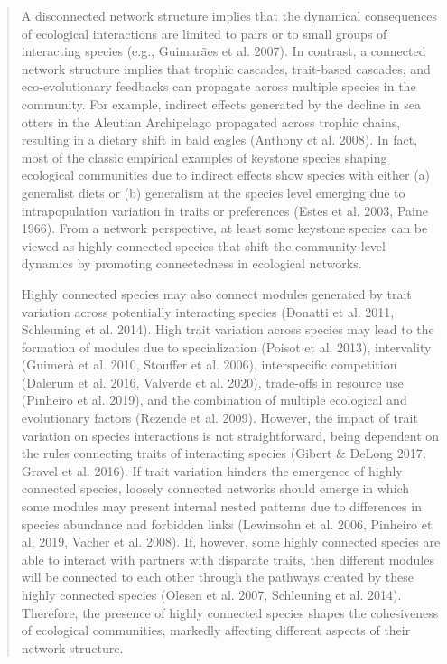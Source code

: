 \documentclass[11pt,twocolumn,twoside,lineno]{pnas-new}
\begin{document}
\begin{quote}
  A disconnected network structure implies that the dynamical
  consequences of ecological interactions are limited to pairs or to
  small groups of interacting species (e.g., Guimarães et
  al. 2007). In contrast, a connected network structure implies that
  trophic cascades, trait-based cascades, and eco-evolutionary
  feedbacks can propagate across multiple species in the
  community. For example, indirect effects generated by the decline in
  sea otters in the Aleutian Archipelago propagated across trophic
  chains, resulting in a dietary shift in bald eagles (Anthony et
  al. 2008). In fact, most of the classic empirical examples of
  keystone species shaping ecological communities due to indirect
  effects show species with either (a) generalist diets or (b)
  generalism at the species level emerging due to intrapopulation
  variation in traits or preferences (Estes et al. 2003, Paine
  1966). From a network perspective, at least some keystone species
  can be viewed as highly connected species that shift the
  community-level dynamics by promoting connectedness in ecological
  networks.

Highly connected species may also connect modules generated by trait
variation across potentially interacting species (Donatti et al. 2011,
Schleuning et al. 2014). High trait variation across species may lead
to the formation of modules due to specialization (Poisot et
al. 2013), intervality (Guimerà et al. 2010, Stouffer et al. 2006),
interspecific competition (Dalerum et al. 2016, Valverde et al. 2020),
trade-offs in resource use (Pinheiro et al. 2019), and the combination
of multiple ecological and evolutionary factors (Rezende et
al. 2009). However, the impact of trait variation on species
interactions is not straightforward, being dependent on the rules
connecting traits of interacting species (Gibert & DeLong 2017, Gravel
et al. 2016). If trait variation hinders the emergence of highly
connected species, loosely connected networks should emerge in which
some modules may present internal nested patterns due to differences
in species abundance and forbidden links (Lewinsohn et al. 2006,
Pinheiro et al. 2019, Vacher et al. 2008). If, however, some highly
connected species are able to interact with partners with disparate
traits, then different modules will be connected to each other through
the pathways created by these highly connected species (Olesen et
al. 2007, Schleuning et al. 2014). Therefore, the presence of highly
connected species shapes the cohesiveness of ecological communities,
markedly affecting different aspects of their network structure.
\end{quote}
\end{document}
